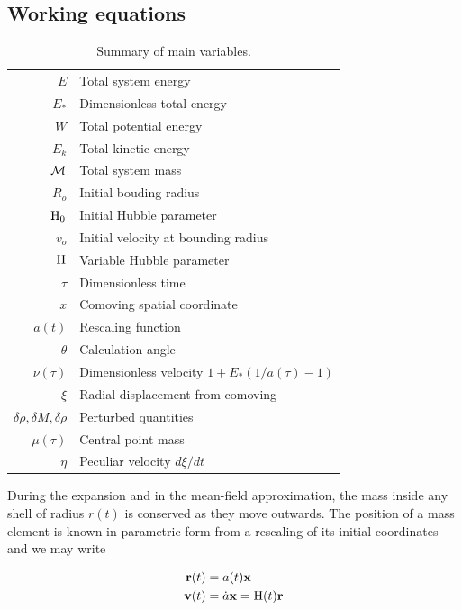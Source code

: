 \subsection{Working equations}



\begin{table}
\begin{center}
\caption{Summary of main variables.}
\label{Tab:identities}
\begin{tabularx}{0.7\textwidth}{rl}
\hline
$E$ & Total system energy \\
$E_*$ & Dimensionless total energy \\
$W$ & Total potential energy \\
$E_k$ & Total kinetic energy\\
$\cal M$ & Total system mass\\
$R_o$ & Initial bouding radius\\
${\textrm{H}}_0$ & Initial Hubble parameter\\
$v_o$ & Initial velocity at bounding radius\\
${\textrm{H}}$ & Variable Hubble parameter\\
$\tau$ & Dimensionless time\\
$x$ & Comoving spatial coordinate\\
$a(t)$ & Rescaling function\\
$\theta$ & Calculation angle\\
$\nu(\tau)$ & Dimensionless velocity $1 + E_*(1/a(\tau)-1)$\\
$\xi$ & Radial displacement from comoving \\
$\delta\rho,\delta M,\delta\rho$ & Perturbed quantities\\
$\mu(\tau)$ & Central point mass\\
$\eta$ & Peculiar velocity $d\xi/dt$\\
\hline
\end{tabularx}
\end{center}
\end{table}

During the expansion and in the mean-field approximation, the mass inside any shell of radius $r(t)$ is conserved as they move outwards. The position of a mass element is known in parametric form from a rescaling of its initial coordinates and we may write 

\begin{align} 
\bold{r}(t) &= a(t)\bold{x}\\
\bold{v}(t) &= \dot{a}\bold{x} = {\textrm{H}}(t)\bold{r} 
\end{align} 

